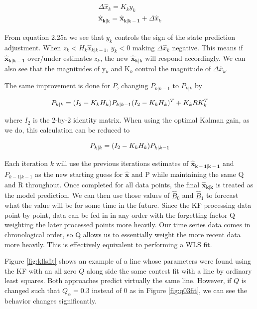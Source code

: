   \begin{subequations}
  \begin{align}
    \Delta\hat{x}_{k} = K_{k}y_{k} \\
    \bm{\hat{x}_{k|k}} = \bm{\hat{x}_{k|k-1}} + \Delta\hat{x}_{k}
    \end{align}
   \end{subequations}

From equation 2.25a we see that $y_{k}$ controls the sign of the state prediction adjustment. When $z_{k} < H_{k}\hat{x}_{k|k-1}$, $y_{k} < 0$ making $\Delta\hat{x}_{k}$ negative. This means if $\bm{\hat{x}_{k|k-1}}$ over/under estimates $z_k$, the new $\bm{\hat{x}_{k|k}}$ will respond accordingly. We can also see that the magnitudes of y$_{k}$ and K$_{k}$ control the magnitude of $\Delta\hat{x}_{k}$.

The same improvement is done for $P$, changing $P_{k|k-1}$ to $P_{k|k}$ by

\begin{equation} 
\centering
P_{k|k} = (I_{2} - K_{k}H_{k})P_{k|k-1}(I_{2} - K_{k}H_{k})^{T} + K_{k}RK_{k}^{T}
\end{equation}

where $I_{2}$ is the 2-by-2 identity matrix. When using the optimal Kalman gain, as we do, this calculation can be reduced to 

\begin{equation} 
\centering
P_{k|k} = (I_{2} - K_{k}H_{k})P_{k|k-1}
\end{equation}

Each iteration $k$ will use the previous iterations estimates of $\bm{\hat{x}_{k-1|k-1}}$ and $P_{k-1|k-1}$ as the new starting guess for $\bm{\hat{x}}$ and P while maintaining the same Q and R throughout. Once completed for all data points, the final $\bm{\hat{x}_{k|k}}$ is treated as the model prediction. We can then use those values of $\hat{B}_{0}$ and $\hat{B}_{1}$ to forecast what the value will be for some time in the future. Since the KF processing data point by point, data can be fed in in any order with the forgetting factor Q weighting the later processed points more heavily. Our time series data comes in chronological order, so Q allows us to essentially weight the more recent data more heavily. This is effectively equivalent to performing a WLS fit.

Figure \ref{fig:kflsfit} shows an example of a line whose parameters were found using the KF with an all zero $Q$ along side the same contest fit with a line by ordinary least squares. Both approaches predict virtually the same line. However, if $Q$ is changed such that $Q_{\alpha} = 0.3$ instead of 0 as in Figure \ref{fig:q03fit}, we can see the behavior changes significantly.

